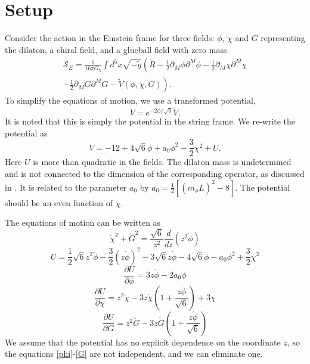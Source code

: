 \documentclass[12pt]{article}
\newcommand{\be}{\begin{equation}}
\newcommand{\ee}{\end{equation}}
\newcommand{\ba}{\begin{eqnarray}}
\newcommand{\ea}{\end{eqnarray}}
\def\thalf{{\textstyle{\frac{1}{2}}}}
\def\tthalf{{\textstyle{\frac{3}{2}}}}
\def\Dz{\frac{d}{dz}}
\def\phidot{\dot{\phi}}
\def\phiddot{\ddot{\phi}}
\def\chidot{\dot{\chi}}
\def\chiddot{\ddot{\chi}}
\def\Gdot{\dot{G}}
\def\Gddot{\ddot{G}}
\def\rt6{\sqrt{6}}
\def\mL2{(m_{\phi}L)^2}
\newcommand{\cS}{\mathcal S}
\begin{document}
\section{Setup}
Consider the action in the Einstein frame for three fields: $\phi$, $\chi$ and $G$ representing the dilaton, a chiral field, and a glueball field with zero mass
\ba
\cS_E=\frac{1}{16\pi G_5} \int d^5x \sqrt{-\tilde{g}}\left(\tilde{R}-\thalf\partial_M\phi\partial^M\phi -\thalf\partial_M\chi\partial^M\chi \right. \\ \nonumber
 \left. -\thalf\partial_M G\partial^M G - \tilde{V}(\phi,\chi,G)\right).
\ea
To simplify the equations of motion, we use a transformed potential, 
\be
V=e^{-2\phi/\rt6}\tilde{V}.
\label{transform}
\ee
It is noted that this is simply the potential in the string frame.
We re-write the potential as
\be
V = -12 + 4\sqrt{6}\phi + a_0\phi^2 -\tthalf\chi^2 + U.
\label{V}
\ee
Here $U$ is more than quadratic in the fields.  
The dilaton mass is undetermined and is not connected to the dimension of the corresponding operator, as discussed in \cite{Springer2010}.  
It is related to the parameter $a_0$ by $a_0 = \thalf \left[ \mL2-8 \right]$. 
The potential should be an even function of $\chi$. 

The equations of motion can be written as
\be
\chidot^2 + \Gdot^2 = \frac{\rt6}{z^2} \Dz(z^2\phidot)
\label{C}
\ee
\be
U=\thalf \rt6 z^2 \phiddot - \tthalf (z\phidot)^2 - 3 \rt6 z\phidot 
-4\sqrt{6}\phi - a_0\phi^2 +\tthalf\chi^2
\label{U}
\ee
\be
 \frac{\partial U}{\partial \phi}=3z\phidot - 2a_0\phi
\label{phi}
\ee
\be
 \frac{\partial U}{\partial \chi}
=z^2\chiddot -3z\chidot \left(1+\frac{z\phidot}{\rt6} \right) + 3\chi
\label{chi}
\ee
\be
 \frac{\partial U}{\partial G}=
z^2\Gddot -3z\Gdot \left(1+\frac{z\phidot}{\rt6} \right)
\label{G}
\ee
We assume that the potential has no explicit dependence on the coordinate $z$,  so the equations \ref{phi}-\ref{G} are not independent, and we can eliminate one. 
\end{document}
